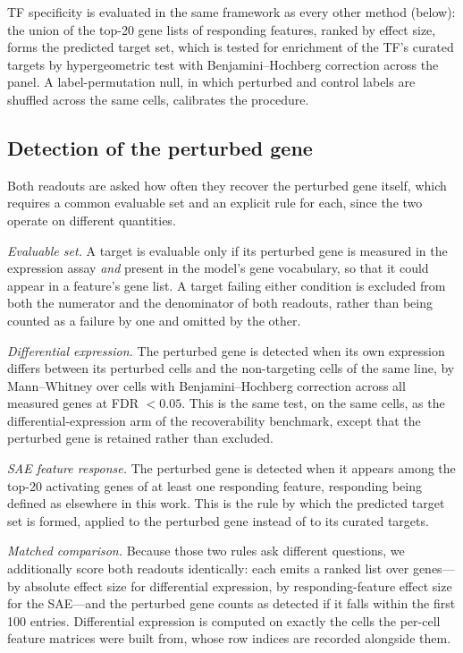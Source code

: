 \documentclass[onecolumn,11pt]{article}
\begin{document}
TF specificity is evaluated in the same framework as every other method (below): the union of the
top-20 gene lists of responding features, ranked by effect size, forms the predicted target set,
which is tested for enrichment of the TF's curated targets by hypergeometric test with
Benjamini--Hochberg correction across the panel. A label-permutation null, in which perturbed and
control labels are shuffled across the same cells, calibrates the procedure.

\subsection*{Detection of the perturbed gene}

Both readouts are asked how often they recover the perturbed gene itself, which requires a common
evaluable set and an explicit rule for each, since the two operate on different quantities.

\emph{Evaluable set.} A target is evaluable only if its perturbed gene is measured in the
expression assay \emph{and} present in the model's gene vocabulary, so that it could appear in a
feature's gene list. A target failing either condition is excluded from both the numerator and the
denominator of both readouts, rather than being counted as a failure by one and omitted by the
other.

\emph{Differential expression.} The perturbed gene is detected when its own expression differs
between its perturbed cells and the non-targeting cells of the same line, by Mann--Whitney over
cells with Benjamini--Hochberg correction across all measured genes at FDR $< 0.05$. This is the
same test, on the same cells, as the differential-expression arm of the recoverability benchmark,
except that the perturbed gene is retained rather than excluded.

\emph{SAE feature response.} The perturbed gene is detected when it appears among the top-20
activating genes of at least one responding feature, responding being defined as elsewhere in this
work. This is the rule by which the predicted target set is formed, applied to the perturbed gene
instead of to its curated targets.

\emph{Matched comparison.} Because those two rules ask different questions, we additionally score
both readouts identically: each emits a ranked list over genes---by absolute effect size for
differential expression, by responding-feature effect size for the SAE---and the perturbed gene
counts as detected if it falls within the first 100 entries. Differential expression is computed on
exactly the cells the per-cell feature matrices were built from, whose row indices are recorded
alongside them.
\end{document}
